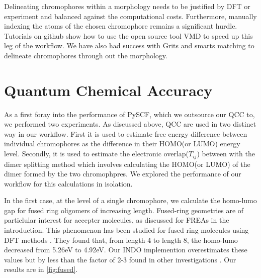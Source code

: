 Delineating chromophores within a morphology needs to  be justified by DFT or experiment and balanced against
the computational costs. Furthermore, manually indexing the atoms of the chosen chromophore
remains a significant hurdle. Tutorials on github show how to use the open source tool VMD to speed up this
leg of the workflow. We have also had success with Grits and smarts matching to delineate chromophores through
out the morphology. 

\section{Quantum Chemical Accuracy}

\label{qccresults}

As a first foray into the performance of PySCF, which we outsource our QCC to, we performed two experiments.
As discussed above, QCC are used in two distinct way in our workflow. First it is used to estimate free energy
difference between individual chromophores as the difference in their HOMO(or LUMO) energy level. Secondly, it is
used to estimate the electronic overlap($T_{ij}$) between with the dimer splitting method which involves
calculating the HOMO(or LUMO) of the dimer formed by the two chromophpres. We explored the performance of our
workflow for this calculations in isolation. 

In the first case, at the level of a single chromophore, we calculate the homo-lumo gap for fused ring
oligomers of increasing length. Fused-ring geometries are of particlular interest for accepter
molecules, as discussed for FREAs in the introduction. 
This phenomenon has been studied for fused ring molecules using DFT methods \cite{Arago2010}.
They found that, from length 4 to length 8, the homo-lumo decreased from 5.26eV to 4.92eV. Our INDO implemention overestimates these values but by less than the
factor of 2-3 found in other investigations \cite{Gorelsky2001} \cite{Gorelsky2016}. 
Our results are in \ref{fig:fused}.

